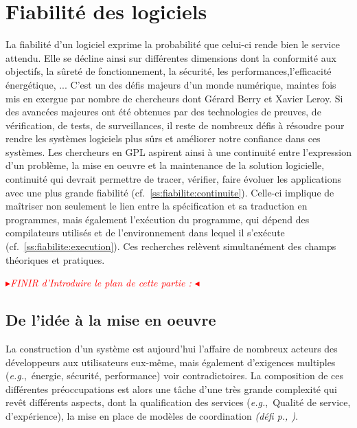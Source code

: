 \documentclass[11pt]{article}
\newcommand{\mynote}[3][black]{\textcolor{#1}{\fbox{\bfseries\sffamily\scriptsize{#2}}
{\small$\blacktriangleright$\textsf{\emph{#3}}$\blacktriangleleft$}}}
\newcommand{\TODO}[1]{\mynote[red]{TODO}{#1}}
\newcommand{\eg}[0]{\emph{e.g.},~}
\newcommand{\defi}[1]{\emph{(défi p.\pageref{#1}, \cite{#1})}}
\begin{document}
\section{Fiabilité des logiciels}
La fiabilité d'un logiciel exprime la probabilité que celui-ci rende bien le service attendu. Elle se décline ainsi sur différentes dimensions dont la conformité aux objectifs, la sûreté de fonctionnement, la sécurité, les performances,l'efficacité énergétique, ... 
C'est un des défis majeurs d'un monde numérique, maintes fois mis en exergue par nombre de chercheurs dont Gérard Berry \cite{berry} et Xavier Leroy\cite{leroy}. Si des avancées majeures ont été obtenues par des technologies de preuves, de vérification, de tests, de surveillances, il reste de nombreux défis à résoudre pour rendre les systèmes logiciels plus sûrs et améliorer notre confiance dans ces systèmes. 
Les chercheurs en GPL aspirent ainsi à une continuité entre l'expression d'un problème, la mise en oeuvre et la maintenance de la solution logicielle, continuité qui devrait permettre de tracer, vérifier, faire évoluer les applications avec une plus grande fiabilité (cf.~\ref{ss:fiabilite:continuite}). Celle-ci implique de maîtriser non seulement le lien entre la spécification et sa traduction en programmes, mais également l'exécution du programme, qui dépend des compilateurs utilisés et de l'environnement dans lequel il s'exécute (cf.~\ref{ss:fiabilite:execution}).
Ces recherches relèvent simultanément des champs théoriques et pratiques.

\TODO{FINIR d'Introduire le plan de cette partie :  }

\subsection{De l'idée à la mise en oeuvre\label{ss:fiabilite:continuite}} 
La construction d'un système est aujourd'hui l'affaire de nombreux acteurs des développeurs aux utilisateurs eux-même, mais également d'exigences multiples (\eg énergie, sécurité, performance) voir contradictoires. La composition de ces différentes préoccupations est alors une tâche d'une très grande complexité qui revêt différents aspects, dont la qualification des services (\eg Qualité de service, d'expérience), la mise en place de modèles de coordination \defi{reconfiguration}.
\end{document}
